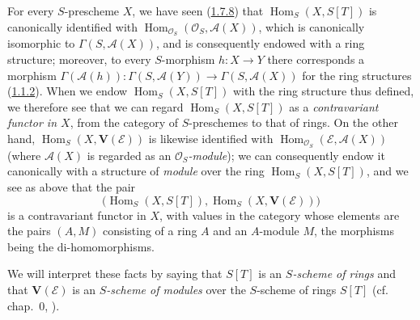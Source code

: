 \begin{env}[1.7.13]
\label{II.1.7.13}
For every $S$-prescheme $X$, we have seen
(\hyperref[II.1.7.8]{1.7.8}) that
$\operatorname{Hom}_S(X,S[T])$ is canonically identified with
$\operatorname{Hom}_{\mathcal{O}_S}(\mathcal{O}_S,\mathcal{A}(X))$, which
is canonically isomorphic to $\Gamma(S,\mathcal{A}(X))$, and is
consequently endowed with a ring structure; moreover, to every
$S$-morphism $h:X\to Y$ there corresponds a morphism
$\Gamma(\mathcal{A}(h)):\Gamma(S,\mathcal{A}(Y))
\to\Gamma(S,\mathcal{A}(X))$ for the ring structures
(\hyperref[II.1.1.2]{1.1.2}). When we endow
$\operatorname{Hom}_S(X,S[T])$ with the ring structure thus defined, we
therefore see that we can regard $\operatorname{Hom}_S(X,S[T])$ as a
\emph{contravariant functor in $X$}, from the category of $S$-preschemes
to that of rings. On the other hand,
$\operatorname{Hom}_S(X,\mathbf{V}(\mathcal{E}))$ is likewise identified
with $\operatorname{Hom}_{\mathcal{O}_S}(\mathcal{E},\mathcal{A}(X))$
(where $\mathcal{A}(X)$ is regarded as an
\emph{$\mathcal{O}_S$-module}); we can consequently endow it canonically
with a structure of \emph{module} over the ring
$\operatorname{Hom}_S(X,S[T])$, and we see as above that the pair
\[
  \bigl(\operatorname{Hom}_S(X,S[T]),
  \operatorname{Hom}_S(X,\mathbf{V}(\mathcal{E}))\bigr)
\]
is a contravariant functor in $X$, with values in the category whose
elements are the pairs $(A,M)$ consisting of a ring $A$ and an $A$-module
$M$, the morphisms being the di-homomorphisms.

We will interpret these facts by saying that $S[T]$ is an
\emph{$S$-scheme of rings} and that $\mathbf{V}(\mathcal{E})$ is an
\emph{$S$-scheme of modules} over the $S$-scheme of rings $S[T]$
(cf. chap.~0, ).
\end{env}

